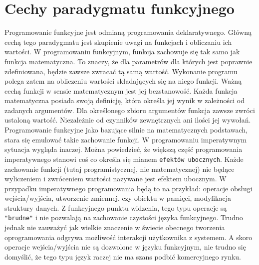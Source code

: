 \documentclass[a4paper,10pt]{report}
\begin{document}
\section{Cechy paradygmatu funkcyjnego}
Programowanie funkcyjne jest odmianą programowania deklaratywnego. Główną cechą tego paradygmatu jest skupienie uwagi na funkcjach i obliczaniu ich wartości. W programowaniu funkcyjnym, funkcja zachowuje się tak samo jak funkcja matematyczna. To znaczy, że dla parametrów dla których jest poprawnie zdefiniowana, będzie zawsze zwracać tą samą wartość. Wykonanie programu polega zatem na obliczeniu wartości składających się na niego funkcji.
Ważną cechą funkcji w sensie matematycznym jest jej bezstanowość. Każda funkcja matematyczna posiada swoją definicję, która określa jej wynik w zależności od zadanych argumentów. Dla określonego zbioru argumentów funkcja zawsze zwróci ustaloną wartość. Niezależnie od czynników zewnętrznych ani ilości jej wywołań. Programowanie funkcyjne jako bazujące silnie na matematycznych podstawach, stara się emulować takie zachowanie funkcji. W programowaniu imperatywnym sytuacja wygląda inaczej. Można powiedzieć, że większą część programowania imperatywnego stanowi coś co określa się mianem \verb|efektów ubocznych|. Każde zachowanie funkcji (tutaj programistycznej, nie matematycznej) nie będące wyliczeniem i zwróceniem wartości nazywane jest efektem ubocznym. W przypadku imperatywnego programowania będą to na przykład: operacje obsługi wejścia/wyjścia, utworzenie zmiennej, czy obiektu w pamięci, modyfikacja struktury danych. Z funkcyjnego punktu widzenia, tego typu operacje są \verb|"brudne"| i nie pozwalają na zachowanie czystości języka funkcyjnego. Trudno jednak nie zauważyć jak wielkie znaczenie w świecie obecnego tworzenia oprogramowania odgrywa możliwość interakcji użytkownika z systemem. A skoro operacje wejścia/wyjścia nie są dozwolone w języku funkcyjnym, nie trudno się domyślić, że tego typu język raczej nie ma szans podbić komercyjnego rynku.
\end{document}
